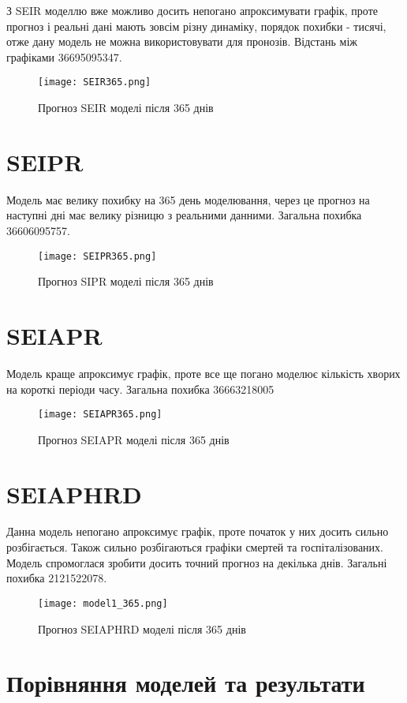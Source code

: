 З SEIR моделлю вже можливо досить непогано апроксимувати графік, проте 
прогноз і реальні дані мають зовсім різну динаміку, порядок похибки - 
тисячі, отже дану модель не можна використовувати для пронозів. 
Відстань між графіками 36695095347.


\begin{figure}[H]
    \centering
    \texttt{[image: SEIR365.png]}
    \caption{Прогноз SEIR моделі після 365 днів}
    \label{fig:plot2}
\end{figure}
\section{SEIPR}

Модель має велику похибку на 365 день моделювання, через це прогноз 
на наступні дні має велику різницю з реальними данними. 
Загальна похибка 36606095757.

\begin{figure}[H]
    \centering
    \texttt{[image: SEIPR365.png]}
    \caption{Прогноз SIPR моделі після 365 днів}
    \label{fig:plot3}
\end{figure}
\section{SEIAPR}

Модель краще апроксимує графік, проте все ще погано моделює 
кількість хворих на короткі періоди часу. 
Загальна похибка 36663218005
\begin{figure}[H]
    \centering
    \texttt{[image: SEIAPR365.png]}
    \caption{Прогноз SEIAPR моделі після 365 днів}
    \label{fig:plot4}
\end{figure}
\section{SEIAPHRD}


Данна модель непогано апроксимує графік, проте початок у них досить сильно 
розбігається. Також сильно розбігаються графіки смертей та госпіталізованих.
Модель спромоглася зробити досить точний прогноз на декілька 
днів. Загальні похибка 2121522078. 
\begin{figure}[H]
    \centering
    \texttt{[image: model1\_365.png]}
    \caption{Прогноз SEIAPHRD моделі після 365 днів}
    \label{fig:plot5}
\end{figure}
\section{Порівняння моделей та результати}